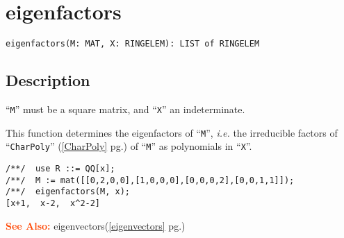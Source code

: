 \documentclass[a4paper]{mybook}
\newenvironment{command}{}{} %
\newcommand\SeeAlso{\par\textcolor{OrangeRed}{\textbf{\large See Also: }}}
\begin{document}
\section{eigenfactors}
\label{eigenfactors}
\begin{command} %


\begin{Verbatim}[label=syntax, rulecolor=\color{MidnightBlue},
frame=single]
eigenfactors(M: MAT, X: RINGELEM): LIST of RINGELEM
\end{Verbatim}


\subsection*{Description}

``\verb&M&'' must be a square matrix, and ``\verb&X&'' an indeterminate.
\par 
This function determines the eigenfactors of ``\verb&M&'', \textit{i.e.} the
irreducible factors of ``\verb&CharPoly&'' (\ref{CharPoly} pg.\pageref{CharPoly}) of ``\verb&M&'' as polynomials in ``\verb&X&''.
\begin{Verbatim}[label=example, rulecolor=\color{PineGreen}, frame=single]
/**/  use R ::= QQ[x];
/**/  M := mat([[0,2,0,0],[1,0,0,0],[0,0,0,2],[0,0,1,1]]);
/**/  eigenfactors(M, x);
[x+1,  x-2,  x^2-2]
\end{Verbatim}


\SeeAlso %
  eigenvectors(\ref{eigenvectors} pg.\pageref{eigenvectors})
\end{command} %
\end{document}

